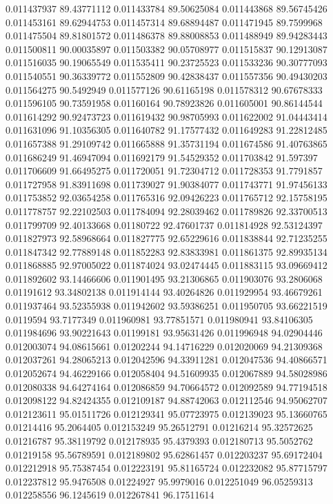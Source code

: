 0.011437937	89.43771112
0.011433784	89.50625084
0.011443868	89.56745426
0.011453161	89.62944753
0.011457314	89.68894487
0.011471945	89.7599968
0.011475504	89.81801572
0.011486378	89.88008853
0.011488949	89.94283443
0.011500811	90.00035897
0.011503382	90.05708977
0.011515837	90.12913087
0.011516035	90.19065549
0.011535411	90.23725523
0.011533236	90.30777093
0.011540551	90.36339772
0.011552809	90.42838437
0.011557356	90.49430203
0.011564275	90.5492949
0.011577126	90.61165198
0.011578312	90.67678333
0.011596105	90.73591958
0.01160164	90.78923826
0.011605001	90.86144544
0.011614292	90.92473723
0.011619432	90.98705993
0.011622002	91.04443414
0.011631096	91.10356305
0.011640782	91.17577432
0.011649283	91.22812485
0.011657388	91.29109742
0.011665888	91.35731194
0.011674586	91.40763865
0.011686249	91.46947094
0.011692179	91.54529352
0.011703842	91.597397
0.011706609	91.66495275
0.011720051	91.72304712
0.011728353	91.7791857
0.011727958	91.83911698
0.011739027	91.90384077
0.011743771	91.97456133
0.011753852	92.03654258
0.011765316	92.09426223
0.011765712	92.15758195
0.011778757	92.22102503
0.011784094	92.28039462
0.011789826	92.33700513
0.011799709	92.40133668
0.01180722	92.47601737
0.011814928	92.53124397
0.011827973	92.58968664
0.011827775	92.65229616
0.011838844	92.71235255
0.011847342	92.77889148
0.011852283	92.83833981
0.011861375	92.89935134
0.011868885	92.97005022
0.011874024	93.02474445
0.011883115	93.09669412
0.011892602	93.14466606
0.011901495	93.21306865
0.011903076	93.2806068
0.01191612	93.34802138
0.011914144	93.40264826
0.011929954	93.46679261
0.011937464	93.52355938
0.011942602	93.59386251
0.011950705	93.66221519
0.0119594	93.7177349
0.011960981	93.77851571
0.011980941	93.84106305
0.011984696	93.90221643
0.01199181	93.95631426
0.011996948	94.02904446
0.012003074	94.08615661
0.01202244	94.14716229
0.012020069	94.21309368
0.012037261	94.28065213
0.012042596	94.33911281
0.012047536	94.40866571
0.012052674	94.46229166
0.012058404	94.51609935
0.012067889	94.58028986
0.012080338	94.64274164
0.012086859	94.70664572
0.012092589	94.77194518
0.012098122	94.82424355
0.012109187	94.88742063
0.012112546	94.95062707
0.012123611	95.01511726
0.012129341	95.07723975
0.012139023	95.13660765
0.01214416	95.2064405
0.012153249	95.26512791
0.01216214	95.32572625
0.01216787	95.38119792
0.012178935	95.4379393
0.012180713	95.5052762
0.01219158	95.56789591
0.012189802	95.62861457
0.012203237	95.69172404
0.012212918	95.75387454
0.012223191	95.81165724
0.012232082	95.87715797
0.012237812	95.9476508
0.01224927	95.9979016
0.012251049	96.05259313
0.012258556	96.1245619
0.012267841	96.17511614
